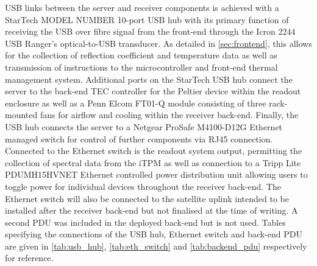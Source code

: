 USB links between the server and receiver components is achieved with a StarTech MODEL NUMBER 10-port USB hub with its primary function of receiving the USB over fibre signal from the front-end through the Icron 2244 USB Ranger’s optical-to-USB transducer. As detailed in \cref{sec:frontend}, this allows for the collection of reflection coefficient and temperature data as well as transmission of instructions to the microcontroller and front-end thermal management system. Additional ports on the StarTech USB hub connect the server to the back-end TEC controller for the Peltier device within the readout enclosure as well as a Penn Elcom FT01-Q module consisting of three rack-mounted fans for airflow and cooling within the receiver back-end. Finally, the USB hub connects the server to a Netgear ProSafe M4100-D12G Ethernet managed switch for control of further components via RJ45 connection. Connected to the Ethernet switch is the readout system output, permitting the collection of spectral data from the iTPM as well as connection to a Tripp Lite PDUMH15HVNET Ethernet controlled power distribution unit allowing users to toggle power for individual devices throughout the receiver back-end. The Ethernet switch will also be connected to the satellite uplink intended to be installed after the receiver back-end but not finalised at the time of writing. A second PDU was included in the deployed back-end but is not used. Tables specifying the connections of the USB hub, Ethernet switch and back-end PDU are given in \cref{tab:usb_hub}, \cref{tab:eth_switch} and \cref{tab:backend_pdu} respectively for reference.


